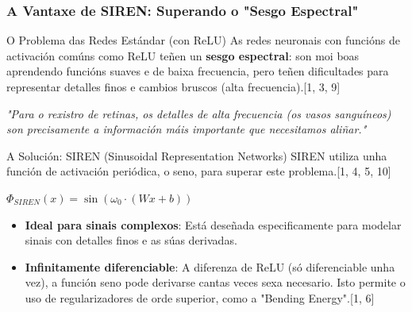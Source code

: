 \documentclass[xcolor=dvipsnames]{beamer}
\begin{document}
    \begin{frame}
    \frametitle{A Vantaxe de SIREN: Superando o "Sesgo Espectral"}
    
    \begin{block}{O Problema das Redes Estándar (con ReLU)}
        As redes neuronais con funcións de activación comúns como ReLU teñen un \textbf{sesgo espectral}: son moi boas aprendendo funcións suaves e de baixa frecuencia, pero teñen dificultades para representar detalles finos e cambios bruscos (alta frecuencia).[1, 3, 9]
        
        \vspace{0.3cm}
        \textit{"Para o rexistro de retinas, os detalles de alta frecuencia (os vasos sanguíneos) son precisamente a información máis importante que necesitamos aliñar."}
    \end{block}
    
    \begin{alertblock}{A Solución: SIREN (Sinusoidal Representation Networks)}
        SIREN utiliza unha función de activación periódica, o seno, para superar este problema.[1, 4, 5, 10]
        
        \vspace{0.3cm}
        \centering
        $\Phi_{SIREN}(x) = \sin(\omega_0 \cdot (Wx + b))$
        \vspace{0.3cm}
        
        \begin{itemize}
            \item \textbf{Ideal para sinais complexos}: Está deseñada especificamente para modelar sinais con detalles finos e as súas derivadas.
            \item \textbf{Infinitamente diferenciable}: A diferenza de ReLU (só diferenciable unha vez), a función seno pode derivarse cantas veces sexa necesario. Isto permite o uso de regularizadores de orde superior, como a "Bending Energy".[1, 6]
        \end{itemize}
    \end{alertblock}
    

\end{frame}
\end{document}
